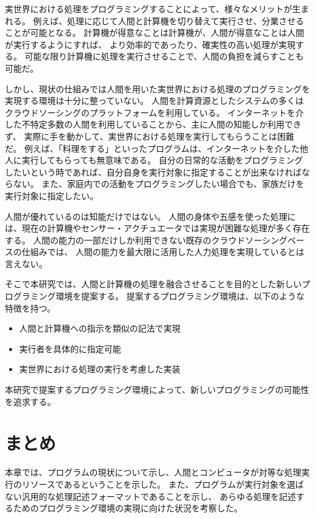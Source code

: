 実世界における処理をプログラミングすることによって、様々なメリットが生まれる。
例えば、処理に応じて人間と計算機を切り替えて実行させ、分業させることが可能となる。
計算機が得意なことは計算機が、人間が得意なことは人間が実行するようにすれば、
より効率的であったり、確実性の高い処理が実現する。
可能な限り計算機に処理を実行させることで、人間の負担を減らすことも可能だ。

しかし、現状の仕組みでは人間を用いた実世界における処理のプログラミングを実現する環境は十分に整っていない。
人間を計算資源としたシステムの多くはクラウドソーシングのプラットフォームを利用している。
インターネットを介した不特定多数の人間を利用していることから、主に人間の知能しか利用できず、
実際に手を動かして、実世界における処理を実行してもらうことは困難だ。
例えば、「料理をする」といったプログラムは、インターネットを介した他人に実行してもらっても無意味である。
自分の日常的な活動をプログラミングしたいという時であれば、自分自身を実行対象に指定することが出来なければならない。
また、家庭内での活動をプログラミングしたい場合でも、家族だけを実行対象に指定したい。

人間が優れているのは知能だけではない。
人間の身体や五感を使った処理には、現在の計算機やセンサー・アクチュエータでは実現が困難な処理が多く存在する。
人間の能力の一部だけしか利用できない既存のクラウドソーシングベースの仕組みでは、
人間の能力を最大限に活用した人力処理を実現しているとは言えない。

そこで本研究では、人間と計算機の処理を融合させることを目的とした新しいプログラミング環境を提案する。
提案するプログラミング環境は、以下のような特徴を持つ。

\begin{itemize}
\itemsep1pt\parskip0pt
\item
  人間と計算機への指示を類似の記法で実現
\item
  実行者を具体的に指定可能
\item
  実世界における処理の実行を考慮した実装
\end{itemize}

本研究で提案するプログラミング環境によって、新しいプログラミングの可能性を追求する。

\section{まとめ}\label{ux307eux3068ux3081}

本章では、プログラムの現状について示し、人間とコンピュータが対等な処理実行のリソースであるということを示した。
また、プログラムが実行対象を選ばない汎用的な処理記述フォーマットであることを示し、
あらゆる処理を記述するためのプログラミング環境の実現に向けた状況を考察した。

